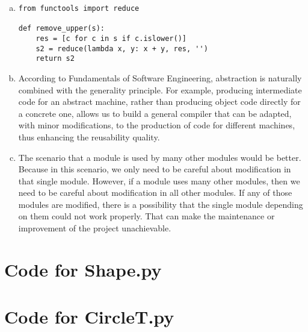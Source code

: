 \documentclass[12pt]{article}
\begin{document}
\begin{enumerate}[a)]
\item 
\begin{lstlisting}
from functools import reduce

def remove_upper(s):
    res = [c for c in s if c.islower()]
    s2 = reduce(lambda x, y: x + y, res, '')
    return s2

\end{lstlisting}

\item According to Fundamentals of Software Engineering, abstraction is naturally combined with the generality principle. For example, producing intermediate code for an abstract machine, rather than producing object code directly for a concrete one, allows us to build a general compiler that can be adapted, with minor modifications, to the production of code for different machines, thus enhancing the reusability quality.

\item The scenario that a module is used by many other modules would be better. Because in this scenario, we only need to be careful about modification in that single module. However, if a module uses many other modules, then we need to be careful about modification in all other modules. If any of those modules are modified, there is a possibility that the single module depending on them could not work properly. That can make the maintenance or improvement of the project unachievable.

\end{enumerate}

\newpage

\lstset{language=Python, basicstyle=\tiny, breaklines=true, showspaces=false,
  showstringspaces=false, breakatwhitespace=true}

\def\thesection{\Alph{section}}

\section{Code for Shape.py}

\noindent 

\newpage

\section{Code for CircleT.py}

\noindent 
\end{document}
